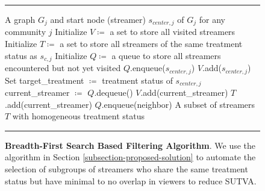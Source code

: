 \documentclass[a4paper,12pt]{article}
\let\emptyset\varnothing
\begin{document}
\begin{figure}[h!]
  \captionsetup{type=algorithm} %
  \centering
  \begin{minipage}{0.98\linewidth}
  \noindent\rule{\linewidth}{0.6pt}
    \begin{algorithmic}[1]
    \Require A graph $G_j$ and start node (streamer) $s_{center,j}$ of $G_j$ for any community $j$
    \State Initialize $V \coloneq $ a set to store all visited streamers
    \State Initialize $T \coloneq $ a set to store all streamers of the same treatment status as $s_{c,j}$
    \State Initialize $Q \coloneq $ a queue to store all streamers encountered but not yet visited 
    \State $Q$.enqueue($s_{center,j}$)
    \State $V$.add($s_{center,j}$)
    \State Set target\_treatment $\coloneq$ treatment status of $s_{center,j}$
    \While{$Q \neq \emptyset$}
        \State current\_streamer $\coloneq$ $Q$.dequeue()
            \State $V$.add(current\_streamer)
                \State $T$.add(current\_streamer)
                        \State $Q$.enqueue(neighbor)
                    \EndIf
                \EndFor
            \EndIf
        \EndIf
    \EndWhile
    \State \Return A subset of streamers $T$ with homogeneous treatment status
    \end{algorithmic}
  \noindent\rule{\linewidth}{0.6pt}
  \end{minipage}
  \caption{\textbf{Breadth-First Search Based Filtering Algorithm}. We use the algorithm in Section \ref{subsection-proposed-solution} to automate the selection of subgroups of streamers 
  who share the same treatment status but have minimal to no overlap in viewers to reduce SUTVA.}
  \label{algorithm-1}
\end{figure}
\end{document}
